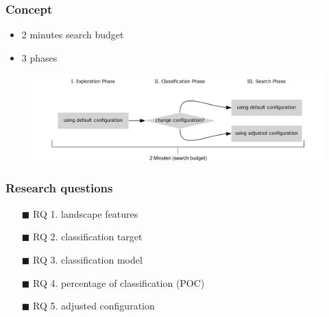 \begin{frame}
	\frametitle{Concept}
	
	\begin{itemize}
		\item 2 minutes search budget
		\item 3 phases
	\end{itemize}
	
	\begin{figure}
		\includegraphics[width=1\textwidth]{figures/xxx}
	\end{figure}
	
\end{frame}

\begin{frame}
	\frametitle{Research questions}
	
	\begin{itemize}\setlength{\itemsep}{10pt}
		\item[$\blacksquare$] RQ 1. landscape features
		\item[$\blacksquare$] RQ 2. classification target
		\item[$\blacksquare$] RQ 3. classification model
		\item[$\blacksquare$] RQ 4. percentage of classification (POC)
		\item[$\blacksquare$] RQ 5. adjusted configuration
	\end{itemize}	

\end{frame}